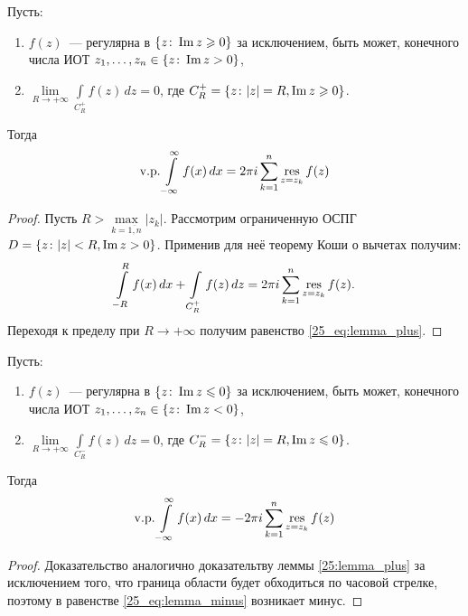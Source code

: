 \begin{lemma} \label{25:lemma_plus}
Пусть:
\begin{enumerate}[wide=20pt, label=\arabic*., itemsep=0ex]
\item \(f(z)\)~--- регулярна в \(\{z \colon \operatorname{Im}{z} \geqslant 0\}\) за исключением, быть может, конечного
    числа ИОТ \(z_1, \dots, z_n \in \{z \colon \operatorname{Im}{z} > 0\}\),
\item \(\lim\limits_{R \to + \infty} \int\limits_{C_R^+} f(z) \, dz = 0\), где \(C_R^+ = \{z \colon
    |z| = R, \operatorname{Im} z \geqslant 0\}\).
\end{enumerate}

Тогда 
\begin{equation}
    \mathrm{v.p.} \int\limits_{-\infty}^{\infty} f(x) \, dx = 2\pi i\sum\limits_{k = 1}^n 
    \operatorname*{res}\limits_{z = z_k} f(z) \label{25_eq:lemma_plus}
\end{equation}
\end{lemma}

\begin{proof}
    Пусть \(R > \max\limits_{k = \overline{1, n}} |z_k|\). Рассмотрим ограниченную ОСПГ \(D = \{
    z \colon |z| < R, \operatorname{Im} z > 0\}\). Применив для неё теорему Коши о вычетах получим:
    \[\int\limits_{-R}^R f(x) \, dx + \int\limits_{C_R^+} f(z) \, dz = 2\pi i \sum\limits_{k = 1}^n 
    \operatorname*{res}\limits_{z = z_k} f(z).\]
    Переходя к пределу при \(R \to +\infty\) получим равенство \eqref{25_eq:lemma_plus}. 
\end{proof}

\begin{lemma} \label{25:lemma_minus}
Пусть:
\begin{enumerate}[wide=20pt, label=\arabic*., itemsep=0ex]
\item \(f(z)\)~--- регулярна в \(\{z \colon \operatorname{Im}{z} \leqslant 0\}\) за исключением, быть может, конечного
    числа ИОТ \(z_1, \dots, z_n \in \{z \colon \operatorname{Im}{z} < 0\}\),
\item \(\lim\limits_{R \to + \infty} \int\limits_{C_R^-} f(z) \, dz = 0\), где \(C_R^- = \{z \colon
    |z| = R, \operatorname{Im} z \leqslant 0\}\).
\end{enumerate}

Тогда 
\begin{equation}
    \mathrm{v.p.} \int\limits_{-\infty}^{\infty} f(x) \, dx = -2\pi i\sum\limits_{k = 1}^n 
    \operatorname*{res}\limits_{z = z_k} f(z) \label{25_eq:lemma_minus}
\end{equation}
\end{lemma}

\begin{proof}
Доказательство аналогично доказательтву леммы \ref{25:lemma_plus} за исключением того, что граница
области будет обходиться по часовой стрелке, поэтому в равенстве \eqref{25_eq:lemma_minus}
возникает минус.
\end{proof}

